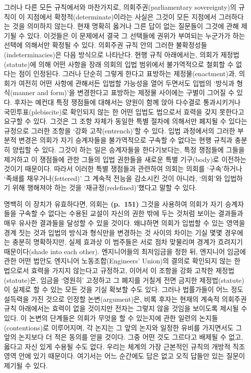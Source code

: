 그러나 다른 모든 규칙에서와 마찬가지로, 의회주권(parliamentary
sovereignty)의 규칙이 이 지점에서 확정적(determinate)이라는 사실은
그것이 모든 지점에서 그러하다는 것을 의미하지 않는다. 현재 명확히 옳거나
그른 답이 없는 질문들이 그것에 관해 제기될 수 있다. 이것들은 이 문제에서
결국 그 선택들에 권위가 부여되는 누군가가 하는 선택에 의해서만 확정될 수
있다. 의회주권 규칙 안의 그러한 불확정성들(indeterminacies)은 다음
방식으로 나타난다. 현행 규칙 아래에서는, 의회가 제정법(statute)에 의해
어떤 사항을 장래 의회의 입법 범위에서 불가역적으로 철회할 수 없다는 점이
인정된다. 그러나 단순히 그렇게 한다고 표방하는 제정물(enactment)과,
의회가 여전히 어떤 사항에 관해서든 입법할 가능성을 열어 두면서도 입법의
‘방식과 형식(manner and form)’을 변경한다고 표방하는 제정물 사이에는
구별이 그어질 수 있다. 후자는 예컨대 특정 쟁점들에 대해서는 양원이 함께
앉아 다수결로 통과시키거나 국민투표(plebiscite)로 확인되지 않는 한 어떤
입법도 법으로서 효력을 갖지 못한다고 요구할 수 있다. 그것은 그 조항
자체가 동일한 특별 절차에 의해서만 폐지될 수 있다는 규정으로 그러한
조항을 ‘강화 고착(entrench)’할 수 있다. 입법 과정에서의 그러한 부분적
변경은 의회가 자기 승계자들을 불가역적으로 구속할 수 없다는 현행 규칙과
충분히 양립할 수 있다. 그것이 하는 일은 승계자들을
한다기보다는, 특정 쟁점들에 
그들을 제거하고 이 쟁점들에 관한 그들의 입법 권한들을 새로운 특별
기구(body)로 이전하는 것이기 때문이다. 따라서 이러한 특별 쟁점들과
관련하여 의회는 의회를 ‘구속’하거나 ‘족쇄를 채우거나(fettered)’ 그
계속적 전능을 감소시킨 것이 아니라, ‘의회’와 입법하기 위해 행해져야 하는
것을 ‘재규정(redefined)’했다고 말할 수 있다.

명백히 이 장치가 유효하다면, 의회는 \textbf{(p.~151)} 그것을 사용하여
의회가 자기 승계자들을 구속할 수 없다는 수용된 교설이 자신의 권한 밖에
두는 것처럼 보이는 결과들과 매우 유사한 결과들을 달성할 수 있을 것이다.
왜냐하면 의회가 입법할 수 있는 영역을 경계 짓는 것과 입법의 방식과
형식만을 변경하는 것 사이의 차이는 기실 몇몇 경우에는 충분히 명확하지만,
실제 효과상 이 범주들은 서로 점차 맞물리며 경계가 흐려지기
때문이다(shade into each other). 엔지니어들의 최저임금을 정한 뒤,
엔지니어 임금에 관한 어떤 법안도 엔지니어 노동조합(Engineers' Union)의
결의로 확인되지 않는 한 법으로서 효력을 가지지 않는다고 규정하고, 이어서
이 조항을 강화 고착한 제정법(statute)은, 임금을 ‘영원히’ 고정하고 그
폐지를 거칠게 전면 금지한 제정법(statute)이 실제로 할 수 있는 모든 것을
기실 확보할 수도 있다. 그러나 법률가들이 어느 정도 설득력을 가진 것으로
인정할 논변(argument)은, 비록 후자는 현재의 계속적 의회주권 규칙
아래에서는 효력이 없을 것이지만 전자는 그렇지 않을 것임을 보이도록
제시될 수 있다. 이 논변의 단계들은 의회가 무엇을 할 수 있는지에 관한
일련의 논지들(contentions)로 이루어지며, 각 논지는 그 앞의 논지와 일정한
유비를 가지면서도 그 앞의 논지보다 더 적은 동의를 얻을 것이다. 그중 어떤
것도 그르다고 배제될 수 없고, 옳다고 자신 있게 수용될 수도 없다. 우리는
체계의 가장 근본적인 규칙의 개방적 직조 영역 안에 있기 때문이다.
여기서는 어느 순간에도 답은 없고 오직 답들만 있는 질문이 제기될 수 있다.

